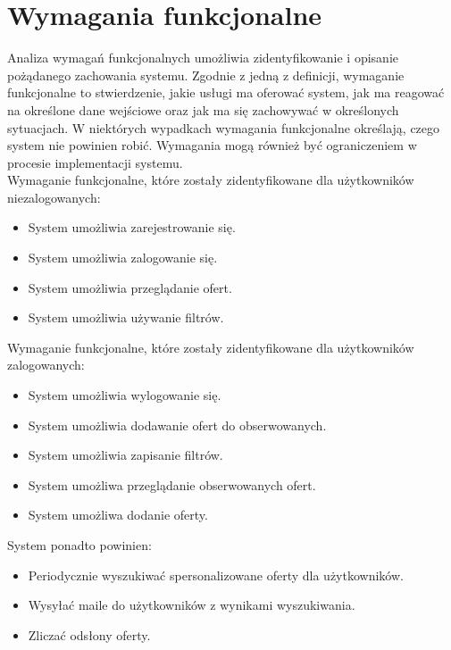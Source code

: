 \section{Wymagania funkcjonalne}
\label{sec:wymaganiaFunkcjonalne}
Analiza wymagań funkcjonalnych umożliwia zidentyfikowanie i opisanie pożądanego zachowania systemu. Zgodnie z jedną z definicji, wymaganie funkcjonalne to stwierdzenie, jakie usługi ma oferować system, jak ma reagować na określone dane wejściowe oraz jak ma się zachowywać w określonych sytuacjach. W niektórych wypadkach wymagania funkcjonalne określają, czego system nie powinien robić. Wymagania mogą również być ograniczeniem w procesie implementacji systemu.\cite{requirements}\\ Wymaganie funkcjonalne, które zostały zidentyfikowane dla użytkowników niezalogowanych:
\begin{itemize}
\item System umożliwia zarejestrowanie się.
\item System umożliwia zalogowanie się.
\item System umożliwia przeglądanie ofert.
\item System umożliwia używanie filtrów.
\end{itemize}
Wymaganie funkcjonalne, które zostały zidentyfikowane dla użytkowników zalogowanych:
\begin{itemize}
\item System umożliwia wylogowanie się.
\item System umożliwia dodawanie ofert do obserwowanych.
\item System umożliwia zapisanie filtrów.
\item System umożliwa przeglądanie obserwowanych ofert.
\item System umożliwa dodanie oferty.
\end{itemize}
System ponadto powinien:
\begin{itemize}
\item Periodycznie wyszukiwać spersonalizowane oferty dla użytkowników.
\item Wysyłać maile do użytkowników z wynikami wyszukiwania.
\item Zliczać odsłony oferty.
\end{itemize}

